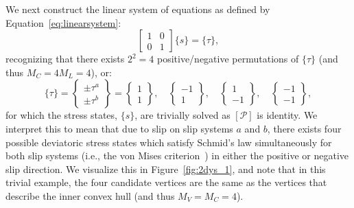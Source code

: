\documentclass[preprint,3p,times,sort&compress,letterpaper,12pt]{elsarticle} %
\begin{document}
We next construct the linear system of equations as defined by Equation~\ref{eq:linearsystem}:
\begin{equation}
    \begin{bmatrix}
        1 & 0 \\
        0 & 1
    \end{bmatrix}
    \{s\} =
    \{\tau\},
\end{equation}
recognizing that there exists $2^2=4$ positive/negative permutations of $\{\tau\}$ (and thus $M_C=4M_L=4$), or:
\begin{equation}
    \{\tau\} = 
    \begin{Bmatrix}
        \pm\tau^a\\
        \pm\tau^b
    \end{Bmatrix}
    =
    \begin{Bmatrix}
        1 \\
        1
    \end{Bmatrix},
    \quad
    \begin{Bmatrix}
        -1 \\
        1
    \end{Bmatrix},
    \quad
    \begin{Bmatrix}
        1 \\
        -1
    \end{Bmatrix},
    \quad
    \begin{Bmatrix}
        -1 \\
        -1
    \end{Bmatrix},
\end{equation}
for which the stress states, $\{s\}$, are trivially solved as $\left[\mathcal{P}\right]$ is identity. We interpret this to mean that due to slip on slip systems $a$ and $b$, there exists four possible deviatoric stress states which satisfy Schmid's law simultaneously for both slip systems (i.e., the von Mises criterion~\cite{Mises1928}) in either the positive or negative slip direction. We visualize this in Figure~\ref{fig:2dys_1}, and note that in this trivial example, the four candidate vertices are the same as the vertices that describe the inner convex hull (and thus $M_V = M_C = 4$).
\end{document}
